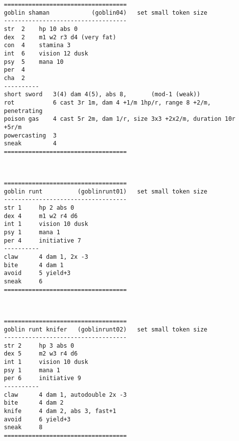 \goodbreak \begin{samepage} \small \begin{verbatim}
===================================
goblin shaman            (goblin04)   set small token size
-----------------------------------
str  2    hp 10 abs 0
dex  2    m1 w2 r3 d4 (very fat)
con  4    stamina 3
int  6    vision 12 dusk
psy  5    mana 10
per  4
cha  2
----------
short sword   3(4) dam 4(5), abs 8,       (mod-1 (weak))
rot           6 cast 3r 1m, dam 4 +1/m 1hp/r, range 8 +2/m, penetrating
poison gas    4 cast 5r 2m, dam 1/r, size 3x3 +2x2/m, duration 10r +5r/m
powercasting  3
sneak         4
===================================
\end{verbatim} \normalsize \end{samepage}

\

\goodbreak \begin{samepage} \small \begin{verbatim}
===================================
goblin runt          (goblinrunt01)   set small token size
-----------------------------------
str 1     hp 2 abs 0
dex 4     m1 w2 r4 d6
int 1     vision 10 dusk
psy 1     mana 1
per 4     initiative 7
----------
claw      4 dam 1, 2x -3
bite      4 dam 1
avoid     5 yield+3
sneak     6
===================================
\end{verbatim} \normalsize \end{samepage}

\

\goodbreak \begin{samepage} \small \begin{verbatim}
===================================
goblin runt knifer   (goblinrunt02)   set small token size
-----------------------------------
str 2     hp 3 abs 0
dex 5     m2 w3 r4 d6
int 1     vision 10 dusk
psy 1     mana 1
per 6     initiative 9
----------
claw      4 dam 1, autodouble 2x -3
bite      4 dam 2
knife     4 dam 2, abs 3, fast+1
avoid     6 yield+3
sneak     8
===================================
\end{verbatim} \normalsize \end{samepage}

\








\goodbreak
{}

